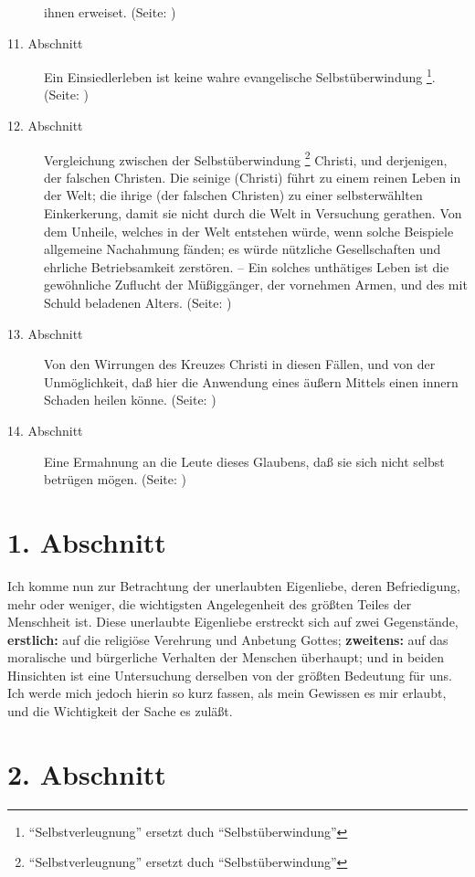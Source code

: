 \begin{description}
ihnen erweiset. (Seite: \pageref{kap5_ab10})
\item[11. Abschnitt] Ein Einsiedlerleben ist keine wahre evangelische
Selbstüberwindung \footnote{"`Selbstverleugnung"' ersetzt duch
"`Selbstüberwindung"'}. (Seite: \pageref{kap5_ab11})
\item[12. Abschnitt] Vergleichung zwischen der Selbstüberwindung
\footnote{"`Selbstverleugnung"' ersetzt duch "`Selbstüberwindung"'} Christi, und
derjenigen, der falschen Christen. Die seinige (Christi) führt zu einem reinen
Leben in
der Welt; die ihrige (der falschen Christen) zu einer selbsterwählten
Einkerkerung, damit sie nicht
durch die Welt in Versuchung gerathen. Von dem Unheile, welches in der Welt
entstehen würde, wenn solche Beispiele allgemeine Nachahmung fänden; es würde
nützliche Gesellschaften und ehrliche Betriebsamkeit zerstören. -- Ein solches
unthätiges Leben ist die gewöhnliche Zuflucht der Müßiggänger, der vornehmen
Armen, und des mit Schuld beladenen Alters. (Seite: \pageref{kap5_ab12})
\item[13. Abschnitt] Von den Wirrungen des Kreuzes Christi in diesen Fällen, und
von der Unmöglichkeit, daß hier die Anwendung eines äußern Mittels einen innern
Schaden heilen könne. (Seite: \pageref{kap5_ab13})
\item[14. Abschnitt] Eine Ermahnung an die Leute dieses Glaubens, daß sie sich
nicht selbst betrügen mögen. (Seite: \pageref{kap5_ab14})

\end{description}
\normalsize

\section{1. Abschnitt} \label{kap5_ab1}

Ich komme nun zur Betrachtung der unerlaubten Eigenliebe, deren Befriedigung,
mehr oder weniger, die wichtigsten Angelegenheit des größten Teiles der
Menschheit ist. Diese unerlaubte Eigenliebe erstreckt sich auf zwei Gegenstände,
\textbf{erstlich:} auf die religiöse Verehrung und Anbetung Gottes;
\textbf{zweitens:} auf das
moralische und bürgerliche Verhalten der Menschen überhaupt; und in beiden
Hinsichten ist eine Untersuchung derselben von der größten Bedeutung für uns.
Ich werde mich jedoch hierin so kurz fassen, als mein Gewissen es mir erlaubt,
und die Wichtigkeit der Sache es zuläßt.

\section{2. Abschnitt} \label{kap5_ab2}

